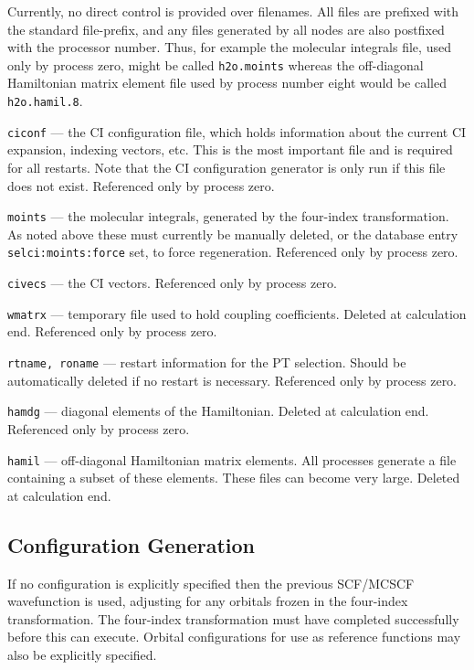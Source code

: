 Currently, no direct control is provided over filenames.  All files
are prefixed with the standard file-prefix, and any files generated by
all nodes are also postfixed with the processor number.  Thus, for
example the molecular integrals file, used only by process zero, might
be called {\tt h2o.moints} whereas the off-diagonal Hamiltonian matrix
element file used by process number eight would be called {\tt
  h2o.hamil.8}.

\begin{description}
\item{\tt ciconf} --- the CI configuration file, which holds
  information about the current CI expansion, indexing vectors, etc.
  This is the most important file and is required for all restarts.
  Note that the CI configuration generator is only run if this file
  does not exist. Referenced only by process zero.
\item{\tt moints} --- the molecular integrals, generated by the four-index
  transformation.  As noted above these must currently be manually
  deleted, or the database entry \verb+selci:moints:force+ set, to
  force regeneration.  Referenced only by process zero.
\item{\tt civecs} --- the CI vectors.    Referenced only by process zero.
\item{\tt wmatrx} --- temporary file used to hold coupling coefficients.
  Deleted at calculation end.  Referenced only by process zero.
\item{\tt rtname, roname} --- restart information for the PT
  selection.  Should be automatically deleted if no restart is
  necessary.  Referenced only by process zero.
\item{\tt hamdg} --- diagonal elements of the Hamiltonian.
  Deleted at calculation end.  Referenced only by process zero.
\item{\tt hamil} --- off-diagonal Hamiltonian matrix elements.  All
  processes generate a file containing a subset of these elements.
  These files can become very large.  Deleted at calculation end.
\end{description}

\subsection{Configuration Generation}

If no configuration is explicitly specified then the previous
SCF/MCSCF wavefunction is used, adjusting for any orbitals frozen in
the four-index transformation.  The four-index transformation must
have completed successfully before this can execute.  Orbital
configurations for use as reference functions may also be explicitly
specified.

